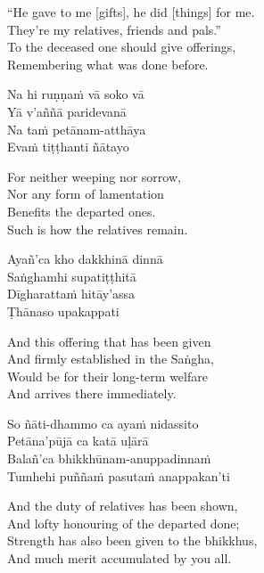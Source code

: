 \begin{english-verses}
  ``He gave to me [gifts], he did [things] for me.\\
  They're my relatives, friends and pals.''\\
  To the deceased one should give offerings,\\
  Remembering what was done before.
\end{english-verses}

\begin{pali-hang-continued}
  Na hi ruṇṇaṁ vā soko vā\\
  Yā v'aññā paridevanā\\
  Na taṁ petānam-atthāya\\
  Evaṁ tiṭṭhanti ñātayo
\end{pali-hang-continued}

\begin{english-verses}
  For neither weeping nor sorrow,\\
  Nor any form of lamentation\\
  Benefits the departed ones.\\
  Such is how the relatives remain.
\end{english-verses}

\begin{pali-hang-continued}
  Ayañ'ca kho dakkhinā dinnā\\
  Saṅghamhi supatiṭṭhitā\\
  Dīgharattaṁ hitāy'assa\\
  Ṭhānaso upakappati
\end{pali-hang-continued}

\begin{english-verses}
  And this offering that has been given\\
  And firmly established in the Saṅgha,\\
  Would be for their long-term welfare\\
  And arrives there immediately.
\end{english-verses}

\begin{pali-hang-continued}
  So ñāti-dhammo ca ayaṁ nidassito\\
  Petāna'pūjā ca katā uḷārā\\
  Balañ'ca bhikkhūnam-anuppadinnaṁ\\
  Tumhehi puññaṁ pasutaṁ anappakan'ti
\end{pali-hang-continued}

\begin{english-verses}
  And the duty of relatives has been shown,\\
  And lofty honouring of the departed done;\\
  Strength has also been given to the bhikkhus,\\
  And much merit accumulated by you all.
\end{english-verses}

